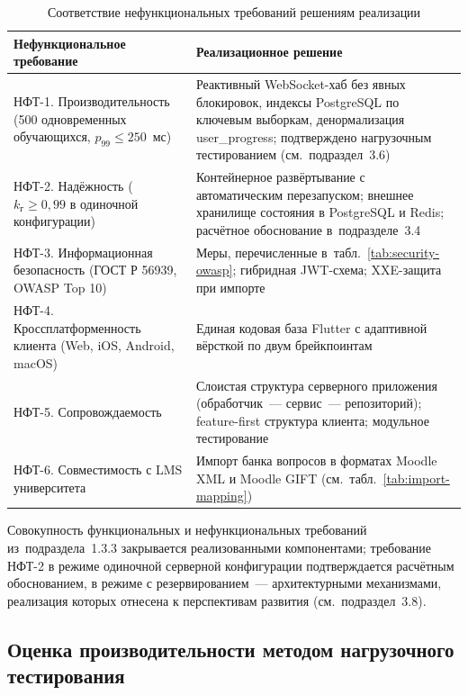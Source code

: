 \begin{table}[!htb]
\fontsize{11pt}{13pt}\selectfont
\centering
\caption{Соответствие нефункциональных требований решениям реализации}
\label{tab:nfr-quality}
\smallskip
\begin{tabular}{|p{4.5cm}|p{8.5cm}|}
    \hline
    \textbf{Нефункциональное требование} & \textbf{Реализационное решение} \\
    \hline
        НФТ-1. Производительность (500 одновременных обучающихся, $p_{99} \leq 250$~мс) & Реактивный WebSocket-хаб без явных блокировок, индексы PostgreSQL по ключевым выборкам, денормализация user\_progress; подтверждено нагрузочным тестированием (см.~подраздел~3.6) \\
    \hline
        НФТ-2. Надёжность ($k_\text{г} \geq 0{,}99$ в одиночной конфигурации) & Контейнерное развёртывание с автоматическим перезапуском; внешнее хранилище состояния в PostgreSQL и Redis; расчётное обоснование в~подразделе~3.4 \\
    \hline
        НФТ-3. Информационная безопасность (ГОСТ Р 56939, OWASP Top 10) & Меры, перечисленные в~табл.~\ref{tab:security-owasp}; гибридная JWT-схема; XXE-защита при импорте \\
    \hline
        НФТ-4. Кроссплатформенность клиента (Web, iOS, Android, macOS) & Единая кодовая база Flutter с адаптивной вёрсткой по двум брейкпоинтам \\
    \hline
        НФТ-5. Сопровождаемость & Слоистая структура серверного приложения (обработчик~--- сервис~--- репозиторий); feature-first структура клиента; модульное тестирование \\
    \hline
        НФТ-6. Совместимость с LMS университета & Импорт банка вопросов в форматах Moodle XML и Moodle GIFT (см.~табл.~\ref{tab:import-mapping}) \\
    \hline
\end{tabular}
\end{table}
\FloatBarrier

Совокупность функциональных и нефункциональных требований
из~подраздела~1.3.3 закрывается реализованными компонентами;
требование НФТ-2 в режиме одиночной серверной конфигурации
подтверждается расчётным обоснованием, в режиме с резервированием~---
архитектурными механизмами, реализация которых отнесена
к перспективам развития (см.~подраздел~3.8).

\subsection{Оценка производительности методом нагрузочного тестирования}

